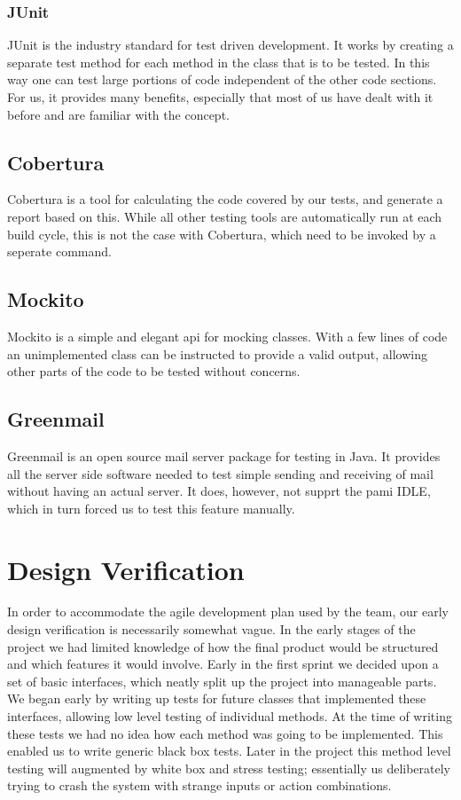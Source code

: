 \subsubsection{JUnit}
JUnit is the industry standard for test driven development. It works by creating a separate test method for each method in the class that is to be tested. In this way one can test large portions of code independent of the other code sections. For us, it provides many benefits, especially that most of us have dealt with it before and are familiar with the concept.

\subsection{Cobertura}
Cobertura is a tool for calculating the code covered by our tests, and generate a report based on this. While all other testing tools are automatically run at each build cycle, this is not the case with
Cobertura, which need to be invoked by a seperate command. 

\subsection{Mockito}
Mockito is a simple and elegant \gls{api} for mocking classes. With a few lines of code an unimplemented class can be instructed to provide a valid output, allowing other parts of the code to be tested without concerns.

\subsection{Greenmail}
Greenmail is an open source mail server package for testing in Java. It provides all the server side software needed to test simple sending and receiving of mail without having an actual server. 
It does, however, not supprt the \gls{pami} IDLE, which in turn forced us to test this feature manually.

\section{Design Verification}
In order to accommodate the agile development plan used by the team, our early design verification is necessarily somewhat vague. In the early stages of the project we had limited knowledge of how the final product would be structured and which features it would involve.
\newline
\newline
Early in the first sprint we decided upon a set of basic interfaces, which neatly split up the project into manageable parts. We began early by writing up tests for future classes that implemented these interfaces, allowing low level testing of individual methods. At the time of writing these tests we had no idea how each method was going to be implemented. This enabled us to write generic black box tests.
\newline
\newline
Later in the project this method level testing will augmented by white box and stress testing; essentially us deliberately trying to crash the system with strange inputs or action combinations. 

